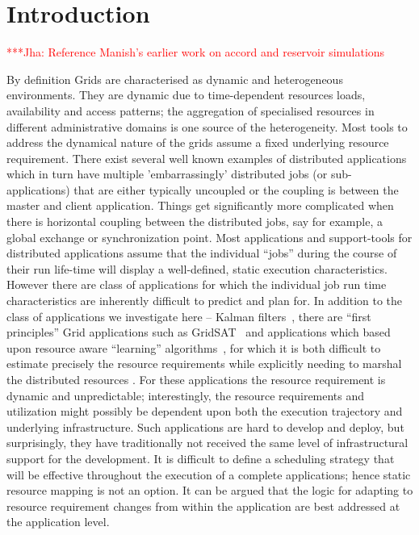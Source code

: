 \documentclass[conference,final]{IEEEtran}
\newcommand{\jhanote}[1]{ {\textcolor{red} { ***Jha: #1 }}}
\begin{document}
\section{Introduction}

\jhanote{Reference Manish's earlier work on accord and reservoir simulations}

By definition Grids are characterised as dynamic and heterogeneous
environments.  They are dynamic due to time-dependent resources loads,
availability and access patterns; the aggregation of specialised
resources in different administrative domains is one source of the
heterogeneity.  Most tools to address the dynamical nature of the
grids assume a fixed underlying resource requirement.  There exist
several well known examples of distributed applications which in turn
have multiple 'embarrassingly' distributed jobs (or sub-applications)
that are either typically uncoupled or the coupling is between the
master and client application.  Things get significantly more
complicated when there is horizontal coupling between the distributed
jobs, say for example, a global exchange or synchronization point.
Most applications and support-tools for distributed applications
assume that the individual ``jobs'' during the course of their run
life-time will display a well-defined, static execution
characteristics.  However there are class of applications for which
the individual job run time characteristics are inherently difficult
to predict and plan for.  In addition to the class of applications we
investigate here -- Kalman filters~\cite{DataAssim, KalmanPaper},
there are ``first principles'' Grid applications such as
GridSAT~\cite{gridsat03} and applications which based upon resource
aware ``learning'' algorithms~\cite{ majority_voting}, for which it is
both difficult to estimate precisely the resource requirements while
explicitly needing to marshal the distributed resources . For these
applications the resource requirement is dynamic and unpredictable;
interestingly, the resource requirements and utilization might
possibly be dependent upon both the execution trajectory and
underlying infrastructure. Such applications are hard to develop and
deploy, but surprisingly, they have traditionally not received the
same level of infrastructural support for the development. It is
difficult to define a scheduling strategy that will be effective
throughout the execution of a complete applications; hence static
resource mapping is not an option.  It can be argued that the logic
for adapting to resource requirement changes from within the
application are best addressed at the application level.
\end{document}

